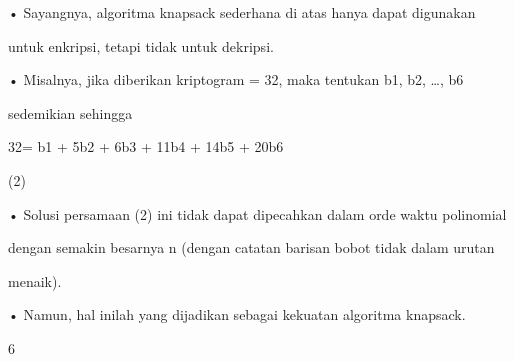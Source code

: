 \documentclass{article}
\begin{document}

• Sayangnya, algoritma knapsack sederhana di atas hanya dapat digunakan 

untuk enkripsi, tetapi tidak untuk dekripsi. 

• Misalnya, jika diberikan kriptogram = 32, maka tentukan b1, b2, …, b6 

sedemikian sehingga 


32= b1 + 5b2 + 6b3 + 11b4 + 14b5 + 20b6 


(2)

• Solusi persamaan (2) ini tidak dapat dipecahkan dalam orde waktu polinomial 

dengan semakin besarnya n (dengan catatan barisan bobot tidak dalam urutan 

menaik). 

• Namun, hal inilah yang dijadikan sebagai kekuatan  algoritma knapsack.

6
\end{document}
